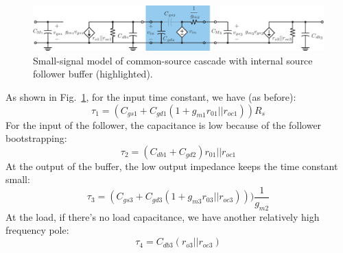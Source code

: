  
\begin{figure}[tb]
\begin{center}
\includegraphics[width=\columnwidth]{5cs_cd_cs_casc_ss_miller}
\end{center}
\caption{Small-signal model of common-source cascade with internal source follower buffer (highlighted).} \label{fig:5cs_cd_cs_casc_ss_miller}
\end{figure}




\noindent As shown in Fig.~\ref{fig:5cs_cd_cs_casc_ss_miller}, for the input time constant, we have (as before):   
%
\begin{equation} 
	\tau_1 = (C_{gs1} + C_{gd1} (1 + g_{m1} r_{01}||r_{oc1})) R_s 
\end{equation}
%
For the input of the follower, the capacitance is low because of the follower bootstrapping:
%
 \begin{equation} 
 	\tau_2 = (C_{db1} + C_{gd2} ) r_{01}||r_{oc1} 
\end{equation}
%
At the output of the buffer, the low output impedance keeps the time constant small:
%
\begin{equation}  
	\tau_3 = (C_{gs3} + C_{gd3} (1 + g_{m3} r_{03}||r_{oc3}))) \frac{1}{g_{m2}} 
\end{equation}
%
At the load, if there's no load capacitance, we have another relatively high frequency pole:
%
\begin{equation}  
	\tau_4 = C_{db3} (r_{o3} || r_{oc3})
\end{equation}

 




\section{\topicC}






